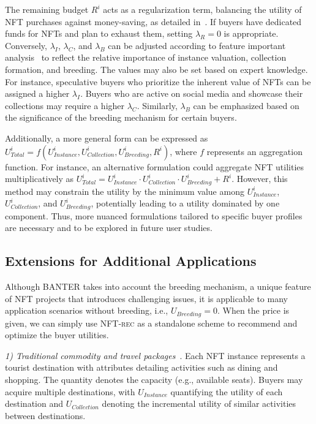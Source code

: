 \documentclass[conference]{IEEEtran}
\newcommand{\1}[1]{\mathds{1}\left[#1\right]}
\theoremstyle{plain}
\newcommand{\eg}{e.g.}
\newcommand{\method}{\textsf{BANTER}\xspace}
\newcommand{\finddemand}{\textsc{NFT-rec}\xspace}
\begin{document}
{The remaining budget $R^i$ acts as a regularization term, balancing the utility of NFT purchases against money-saving, as detailed in~\cite{zhang2022price}. If buyers have dedicated funds for NFTs and plan to exhaust them, setting $\lambda_{R}=0$ is appropriate. Conversely, $\lambda_{I}$, $\lambda_{C}$, and $\lambda_{B}$ can be adjusted according to feature important analysis~\cite{altmann2010permutation, chen2023algorithms} to reflect the relative importance of instance valuation, collection formation, and breeding. The values may also be set based on expert knowledge. For instance, speculative buyers who prioritize the inherent value of NFTs can be assigned a higher $\lambda_{I}$. Buyers who are active on social media and showcase their collections may require a higher $\lambda_{C}$. Similarly, $\lambda_{B}$ can be emphasized based on the significance of the breeding mechanism for certain buyers.

Additionally, a more general form can be expressed as $U^i_\textit{Total} = f(U^i_\textit{Instance}, U^i_\textit{Collection}, U^i_\textit{Breeding}, R^i)$, where $f$ represents an aggregation function. For instance, an alternative formulation could aggregate NFT utilities multiplicatively as $U^i_\textit{Total} = U^i_\textit{Instance} \cdot U^i_\textit{Collection} \cdot U^i_\textit{Breeding} + R^i$. However, this method may constrain the utility by the minimum value among $U^i_\textit{Instance}$, $U^i_\textit{Collection}$, and $U^i_\textit{Breeding}$, potentially leading to a utility dominated by one component. Thus, more nuanced formulations tailored to specific buyer profiles are necessary and to be explored in future user studies.

\subsection{Extensions for Additional Applications}
\label{appsubsec:extension-application}
    Although \method takes into account the breeding mechanism, a unique feature of NFT projects that introduces challenging issues, it is applicable to many application scenarios without breeding, i.e., $U_\textit{Breeding}=0$. When the price is given, we can simply use \finddemand as a standalone scheme to recommend and optimize the buyer utilities. 
    
    \textit{1) Traditional commodity and travel packages}~\cite{chen2013travel, liu2011personalized, ge2011cost}. Each NFT instance represents a tourist destination with attributes detailing activities such as dining and shopping. The quantity denotes the capacity (\eg, available seats). Buyers may acquire multiple destinations, with $U_\textit{Instance}$ quantifying the utility of each destination and $U_\textit{Collection}$ denoting the incremental utility of similar activities between destinations. 
    
}
\end{document}

